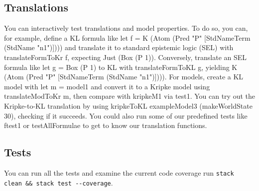 \documentclass[12pt,a4paper]{article}
\begin{document}
\subsection{Translations}
You can interactively test translations and model properties. To do so, you can, for example, define a KL formula like let f = K (Atom (Pred "P" [StdNameTerm (StdName "n1")]))) and translate it to standard epistemic logic (SEL) with translateFormToKr f, expecting Just (Box (P 1)). 
Conversely, translate an SEL formula like let g = Box (P 1) to KL with translateFormToKL g, yielding K (Atom (Pred "P" [StdNameTerm (StdName "n1")]))). 
For models, create a KL model with let m = model1 and convert it to a Kripke model using translateModToKr m, then compare with kripkeM1 via test1. You can try out the Kripke-to-KL translation by using kripkeToKL exampleModel3 (makeWorldState 30), checking if it succeeds. You could also run some of our predefined tests like ftest1 or testAllFormulae to get to know our translation functions.

\subsection{Tests}
You can run all the tests and examine the current code coverage run \verb|stack clean && stack test --coverage|.








%

% 

\printbibliography
\end{document}
